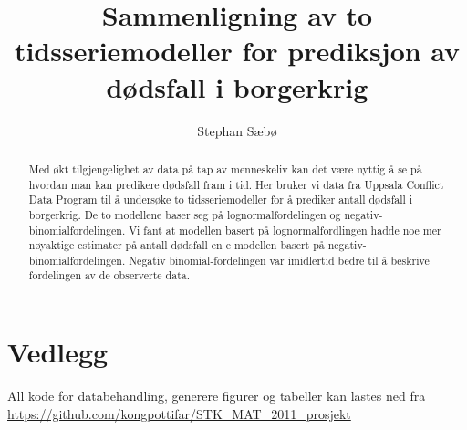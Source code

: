 \documentclass[norsk, bachelor, final]{uiomaster}  %
\title{Sammenligning av to tidsseriemodeller for prediksjon av dødsfall i borgerkrig}        %
\author{Stephan Sæbø}                      %
\begin{document}
\uiomasterfp[dept={Department of Mathematics},  %
  program={STK-MAT2011 – Prosjektarbeid i finans, forsikring, risiko og dataanalyse},                        %
  supervisor={Gudmund Hermansen},                    %
  bachelor,                                   %
  color=green]                                  %



\begin{abstract}
    Med økt tilgjengelighet av data på tap av menneskeliv kan det være nyttig å
    se på hvordan man kan predikere dødsfall fram i tid. Her bruker vi data fra
    Uppsala Conflict Data Program til å undersøke to tidsseriemodeller for å
    prediker antall dødsfall i borgerkrig. De to modellene baser seg på
    lognormalfordelingen og negativ-binomialfordelingen. Vi fant at modellen
    basert på lognormalfordlingen hadde noe mer nøyaktige estimater på antall
    dødsfall en e modellen basert på negativ-binomialfordelingen. Negativ
    binomial-fordelingen var imidlertid bedre til å beskrive fordelingen av de
    observerte data.  
\end{abstract}

















\clearpage

\printbibliography{}

\section*{Vedlegg}

All kode for databehandling, generere figurer og tabeller kan lastes ned fra 
\url{https://github.com/kongpottifar/STK_MAT_2011_prosjekt}
\end{document}
